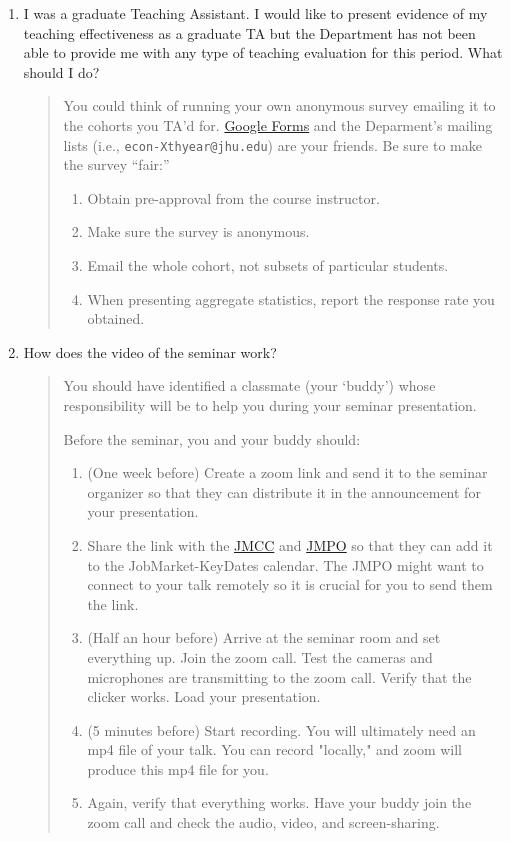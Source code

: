 \documentclass{\classes/econtex}
\providecommand\phantomsection{}
\begin{document}
\begin{enumerate}
\begin{quote}
    \ifdvi\phantomsection\hypertarget{PostOtherDocsQ}{}\fi
  \end{quote}
\item I was a graduate Teaching Assistant. I would like to present evidence of my teaching effectiveness as a graduate TA but the Department has not been able to provide me with any type of teaching evaluation for this period. What should I do?

\begin{quote}
	You could think of running your own anonymous survey emailing it to the cohorts you TA'd for. \href{https://docs.google.com/forms/}{Google Forms} and the Deparment's mailing lists (i.e., \texttt{econ-Xthyear@jhu.edu}) are your friends. Be sure to make the survey ``fair:''
	\begin{enumerate}
		\item Obtain pre-approval from the course instructor.
		\item Make sure the survey is anonymous.
		\item Email the whole cohort, not subsets of particular students.
		\item When presenting aggregate statistics, report the response rate you obtained.
	\end{enumerate}
\end{quote}

\item  How does the video of the seminar work?
  
  \begin{quote}
    You should have identified a classmate (your `buddy') whose
    responsibility will be to help you during your seminar presentation.
    
    Before the seminar, you and your buddy should:
    \begin{enumerate}
    	\item (One week before) Create a zoom link and send it to the seminar organizer so that they can distribute it in the announcement for your presentation.
    	\item Share the link with the \href{\Notationpage}{JMCC} and \href{\Notationpage}{JMPO} so that they can add it to the JobMarket-KeyDates calendar. The JMPO might want to connect to your talk remotely so it is crucial for you to send them the link.
    	\item (Half an hour before) Arrive at the seminar room and set everything up. Join the zoom call. Test the cameras and microphones are transmitting to the zoom call. Verify that the clicker works. Load your presentation.
    	\item (5 minutes before) Start recording. You will ultimately need an mp4 file of your talk. You can record "locally," and zoom will produce this mp4 file for you.
    	\item Again, verify that everything works. Have your buddy join the zoom call and check the audio, video, and screen-sharing.
    \end{enumerate}
    

\end{quote}
\end{enumerate}
\end{document}

